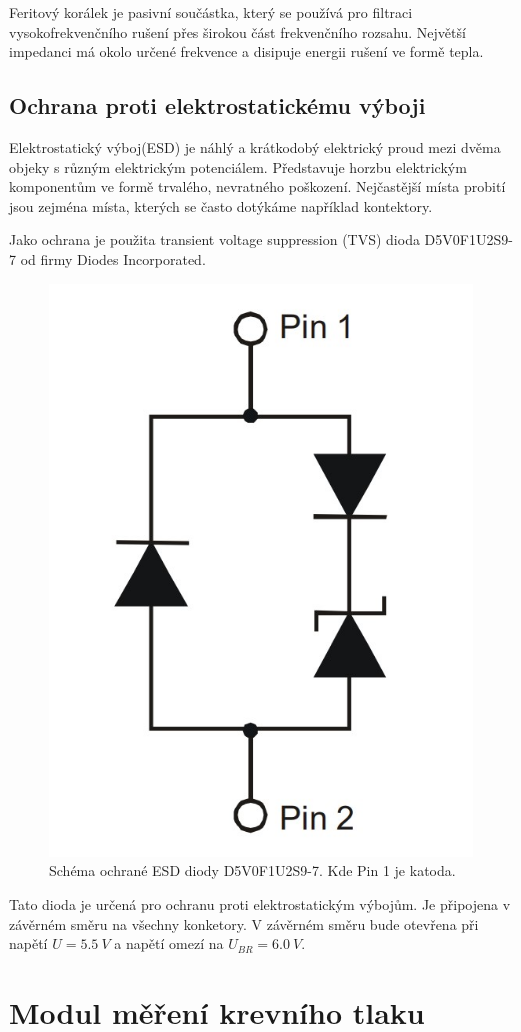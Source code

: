 Feritový korálek je pasivní součástka, který se používá pro filtraci vysokofrekvenčního rušení přes širokou část frekvenčního rozsahu. Největší impedanci má okolo určené frekvence a disipuje energii rušení ve formě tepla.
\subsection{Ochrana proti elektrostatickému výboji}
Elektrostatický výboj(ESD) je náhlý a krátkodobý elektrický proud mezi dvěma objeky s různým elektrickým potenciálem. Představuje horzbu elektrickým komponentům ve formě trvalého, nevratného poškození. Nejčastější místa probití jsou zejména místa, kterých se často dotýkáme například kontektory.
\par
Jako ochrana je použita transient voltage suppression (TVS) dioda D5V0F1U2S9-7 od firmy Diodes Incorporated.

\begin{figure}[H]
    \centering
    \includegraphics[width=0.4\linewidth]{pictures/esd_diode_schema.jpg}
    \caption{Schéma ochrané ESD diody D5V0F1U2S9-7. Kde Pin 1 je katoda.}
    \label{fig:esd_diode}
\end{figure}

Tato dioda je určená pro ochranu proti elektrostatickým výbojům. Je připojena v závěrném směru na všechny konketory. V závěrném směru bude otevřena při napětí
$U = 5.5 \ V $ a napětí omezí na $U_{BR} = 6.0 \ V $.

\section{Modul měření krevního tlaku}

